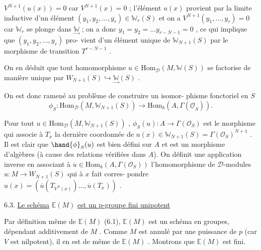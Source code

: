 
$V^{N+1}(u(x)) = 0$ car $V^{N+1}(x) = 0$ ; l'élément $u(x)$ provient par la
limite inductive d'un élément $(y_1,y_2,\ldots,y_r) \in \mathbb{W}_r(S)$ et on a
$V^{N+1}(y_1,\ldots,y_r) = 0$ car $\mathbb{W}_r$ se plonge dans $\underset{\rightarrow}{\mathbb{W}}$ ; on a donc
$y_1 = y_2 = \ldots y_{r-N-1} = 0$ , ce qui implique que $(y_1,y_2,\ldots,y_r)$ pro-%
vient d'un élément unique de $\mathbb{W}_{N+1}(S)$ par le morphisme de transition
$T^{r-N-1}$ .

On en déduit que tout homomorphisme $u \in \mathrm{Hom}_{\mathcal{D}}(M, \mathbb{W}(S))$ se
factorise de manière unique par $W_{N+1}(S) \hookrightarrow \underset{\rightarrow}{\mathbb{W}}(S)$ .

On est donc ramené au problème de construire un isomor-%
phisme fonctoriel en $S$
\[ \phi_S : \mathrm{Hom}_{\mathcal{D}}(M, \mathbb{W}_{N+1}(S)) \rightarrow \mathrm{Hom}_k(A, \Gamma(\underline{\mathcal{O}}_S)) . \]

Pour tout $u \in \mathrm{Hom}_{\mathcal{D}}(M, \mathbb{W}_{N+1}(S))$ , $\phi_S(u) : A \rightarrow \Gamma(\mathcal{O}_S)$ est
le morphisme qui associe à $T_x$ la dernière coordonnée de
\margin{$\times$} $u(x) \in \mathbb{W}_{N+1}(S) = \Gamma(\mathcal{O}_S)^{N+1}$ . Il est clair que $\hand{\phi}_S(u)$ est bien défini
sur $A$ et est un morphisme d'algèbres (à cause des relations vérifiées
dans $A$). On définit une application inverse en associant à $\overline{u} \in \mathrm{Hom}_k(A, \Gamma(\mathcal{O}_S))$
l'homomorphisme de $\mathcal{D}$-modules $u : M \rightarrow W_{N+1}(S)$ qui à $x$ fait corres-%
pondre $u(x) = (\overline{u}(T_{V^N(x)})\ldots, \overline{u}(T_x))$ .

6.3. \uline{Le schéma} $\mathbb{E}(M)$ \uline{est un p-groupe fini unipotent}

Par définition même de $\mathbb{E}(M)$ (6.1), $\mathbb{E}(M)$ est un schéma
en groupes, dépendant additivement de $M$ . Comme $M$ est annulé par une
puissance de $p$ (car $V$ est nilpotent), il en est de même de $\mathbb{E}(M)$ .
Montrons que $\mathbb{E}(M)$ est fini.

